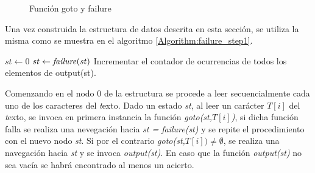 {\begin{example*}
\begin{figure}[H]
\caption[Ejemplo: función goto y failure]{Función goto y failure}
	\label{fig:failure_function}
\end{figure}
\end{example*}
\myrule{}{}
Una vez construida la estructura de datos descrita en esta sección, se utiliza la misma como se muestra en el algoritmo {\ref{Algorithm:failure_step1}}.\\
\begin{algorithm}[h]
\small
\caption{Utilización de la estructura AC para reconocer patrones en un {\emph texto}}
\label{Algorithm:failure_step1}
\begin{algorithmic}[1]
	\State $st \gets 0$
			\State $st \gets {\it failure(st)}$
		\EndWhile	
			\State Incrementar el contador de ocurrencias de todos los elementos de output(st).
		\EndIf
	\EndFor
	\Statex
\end{algorithmic}
  \vspace{-0.4cm}%
\end{algorithm}
Comenzando en el nodo 0 de la estructura se procede a leer secuencialmente cada uno de los caracteres del {\emph texto}. Dado un estado {\it st}, al leer un carácter $T[i]$ del {\emph texto}, se invoca en primera instancia la función {\it goto(st,$T[i]$)}, si dicha función falla se realiza una nevegación hacia {\it st = failure(st)} y se repite el procedimiento con el nuevo nodo {\it st}. Si por el contrario {\it goto(st,$T[i]) \not= \emptyset$}, se realiza una navegación hacia {\it st} y se invoca {\it output(st)}. En caso que la función {\it output(st)} no sea vacía se habrá encontrado al menos un acierto.
}
